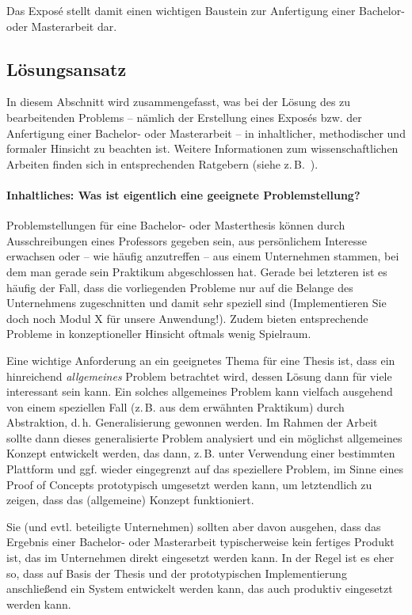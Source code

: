 \documentclass[11pt]{scrartcl}
\newcommand{\qto}[1]{\glqq #1\grqq}				%
\newcommand{\zB}{\mbox{z.\,B.}\xspace}
\newcommand{\dH}{\mbox{d.\,h.}\xspace} %
\newcommand{\ggf}{ggf.\xspace}
\newcommand{\evtl}{evtl.\xspace}
\newcommand{\bzw}{bzw.\xspace}
\begin{document}
\noindent
Das Exposé stellt damit einen wichtigen Baustein zur Anfertigung einer Bachelor- oder Masterarbeit dar.



\subsection{Lösungsansatz}

In diesem Abschnitt wird zusammengefasst, was bei der Lösung des zu bearbeitenden \qto{Problems} -- nämlich der Erstellung eines Exposés \bzw der Anfertigung einer Bachelor- oder Masterarbeit -- in inhaltlicher, methodischer und formaler Hinsicht zu beachten ist. Weitere Informationen zum wissenschaftlichen Arbeiten finden sich in entsprechenden Ratgebern (siehe \zB~\cite{lit:FolzEtAl:Studi-SOS}).

\paragraph{Inhaltliches: Was ist eigentlich eine geeignete Problemstellung?}

Problemstellungen für eine Bachelor- oder Masterthesis können durch Ausschreibungen eines Professors gegeben sein, aus persönlichem Interesse erwachsen oder -- wie häufig anzutreffen -- aus einem Unternehmen stammen, bei dem man gerade sein Praktikum abgeschlossen hat. Gerade bei letzteren ist es häufig der Fall, dass die vorliegenden Probleme nur auf die Belange des Unternehmens zugeschnitten und damit sehr speziell sind (\qto{Implementieren Sie doch noch Modul X für unsere Anwendung!}). Zudem bieten entsprechende Probleme in konzeptioneller Hinsicht oftmals wenig Spielraum.

Eine wichtige Anforderung an ein geeignetes Thema für eine Thesis ist, dass ein hinreichend \emph{allgemeines} Problem betrachtet wird, dessen Lösung dann für viele interessant sein kann. Ein solches allgemeines Problem kann vielfach ausgehend von einem speziellen Fall (\zB aus dem erwähnten Praktikum) durch Abstraktion, \dH Generalisierung gewonnen werden. Im Rahmen der Arbeit sollte dann dieses generalisierte Problem analysiert und ein möglichst allgemeines Konzept entwickelt werden, das dann, \zB unter Verwendung einer bestimmten Plattform und \ggf wieder eingegrenzt auf das speziellere Problem, im Sinne eines \qto{Proof of Concepts} prototypisch umgesetzt werden kann, um letztendlich zu zeigen, dass das (allgemeine) Konzept funktioniert.

Sie (und \evtl beteiligte Unternehmen) sollten aber davon ausgehen, dass das Ergebnis einer Bachelor- oder Masterarbeit typischerweise kein fertiges Produkt ist, das im Unternehmen direkt eingesetzt werden kann. In der Regel ist es eher so, dass auf Basis der Thesis und der prototypischen Implementierung anschließend ein System entwickelt werden kann, das auch produktiv eingesetzt werden kann.
\end{document}
